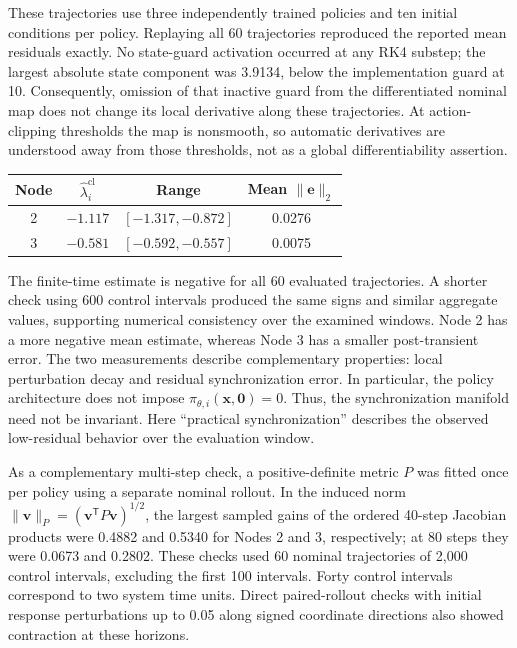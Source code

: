 \documentclass[a4paper,fleqn]{cas-dc}
\theoremstyle{plain}
\theoremstyle{definition}
\begin{document}
These trajectories use three independently trained policies and ten initial conditions per policy. Replaying all 60 trajectories reproduced the reported mean residuals exactly. No state-guard activation occurred at any RK4 substep; the largest absolute state component was 3.9134, below the implementation guard at 10. Consequently, omission of that inactive guard from the differentiated nominal map does not change its local derivative along these trajectories. At action-clipping thresholds the map is nonsmooth, so automatic derivatives are understood away from those thresholds, not as a global differentiability assertion.

\begin{center}
	\centering
	\small
	\label{tab:closed_loop_conditional_lyapunov}
	\begin{tabular}{@{}cccc@{}}
		\toprule
		Node & $\widehat\lambda_i^{\mathrm{cl}}$ & Range & Mean $\|\mathbf{e}\|_2$ \\
		\midrule
		2 & $-1.117$ & $[-1.317,-0.872]$ & 0.0276 \\
		3 & $-0.581$ & $[-0.592,-0.557]$ & 0.0075 \\
		\bottomrule
	\end{tabular}
\end{center}

The finite-time estimate is negative for all 60 evaluated trajectories. A shorter check using 600 control intervals produced the same signs and similar aggregate values, supporting numerical consistency over the examined windows. Node 2 has a more negative mean estimate, whereas Node 3 has a smaller post-transient error. The two measurements describe complementary properties: local perturbation decay and residual synchronization error. In particular, the policy architecture does not impose $\pi_{\theta,i}(\mathbf{x},\mathbf{0})=0$. Thus, the synchronization manifold need not be invariant. Here ``practical synchronization'' describes the observed low-residual behavior over the evaluation window.


As a complementary multi-step check, a positive-definite metric $P$ was fitted once per policy using a separate nominal rollout. In the induced norm $\|\mathbf{v}\|_P=(\mathbf{v}^{\mathsf T}P\mathbf{v})^{1/2}$, the largest sampled gains of the ordered 40-step Jacobian products were 0.4882 and 0.5340 for Nodes 2 and 3, respectively; at 80 steps they were 0.0673 and 0.2802. These checks used 60 nominal trajectories of 2,000 control intervals, excluding the first 100 intervals. Forty control intervals correspond to two system time units. Direct paired-rollout checks with initial response perturbations up to 0.05 along signed coordinate directions also showed contraction at these horizons.
\end{document}
